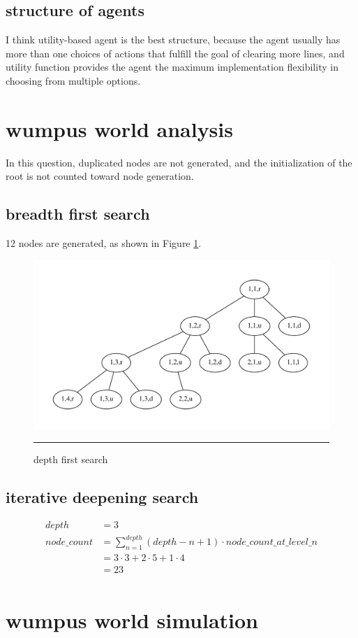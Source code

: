 \documentclass[12pt]{article}
\begin{document}
\subsection{structure of agents}
I think utility-based agent is the best structure, because the agent usually has more than one choices of actions that fulfill the goal of clearing more lines, and utility function provides the agent the maximum implementation flexibility in choosing from multiple options.
\section{wumpus world analysis}
In this question, duplicated nodes are not generated, and the initialization of the root is not counted toward node generation.
\subsection{breadth first search}
12 nodes are generated, as shown in Figure \ref{fig:bfs}.
\begin{figure}[htb]
  \centering
      {\includegraphics[width=1\linewidth]{1_3_a.png}} \rule{1\linewidth}{1pt}
      \caption{depth first search}
      \label{fig:bfs}
\end{figure}
\subsection{iterative deepening search}
\begin{align*}
  depth &= 3 \\
  node\_count &= \sum_{n=1}^{depth} (depth-n+1) \cdot node\_count\_at\_level\_n \\
  &= 3 \cdot 3 + 2 \cdot 5 + 1 \cdot 4 \\
  &= 23 \\
\end{align*}
\section{wumpus world simulation}
\end{document}
